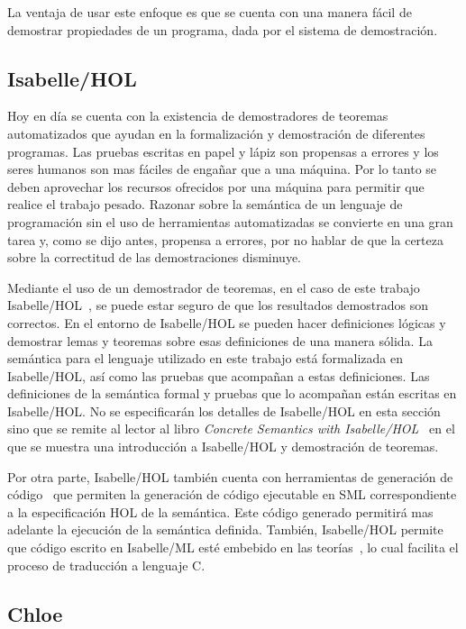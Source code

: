 La ventaja de usar este enfoque es que se cuenta con una manera fácil de demostrar propiedades de un programa, dada por el sistema de demostración.


\subsection{Isabelle/HOL}\label{section:isabelle/hol}

Hoy en día se cuenta con la existencia de demostradores de teoremas automatizados que ayudan en la formalización y demostración de diferentes programas.
Las pruebas escritas en papel y lápiz son propensas a errores y los seres humanos son mas fáciles de engañar que a una máquina.
Por lo tanto se deben aprovechar los recursos ofrecidos por una máquina para permitir que realice el trabajo pesado.
Razonar sobre la semántica de un lenguaje de programación sin el uso de herramientas automatizadas se convierte en una gran tarea y, como se dijo antes, propensa a errores, por no hablar de que la certeza sobre la correctitud de las demostraciones disminuye.

Mediante el uso de un demostrador de teoremas, en el caso de este trabajo Isabelle/HOL~\citep{isabelle-tutorial}, se puede estar seguro de que los resultados demostrados son correctos.
En el entorno de Isabelle/HOL se pueden hacer definiciones lógicas y demostrar lemas y teoremas sobre esas definiciones de una manera sólida.
La semántica para el lenguaje utilizado en este trabajo está formalizada en Isabelle/HOL, así como las pruebas que acompañan a estas definiciones.
Las definiciones de la semántica formal y pruebas que lo acompañan están escritas en Isabelle/HOL.
No se especificarán los detalles de Isabelle/HOL en esta sección sino que se remite al lector al libro \textit{Concrete Semantics with Isabelle/HOL}~\citep{nipkow} en el que se muestra una introducción a Isabelle/HOL y demostración de teoremas.

Por otra parte, Isabelle/HOL también cuenta con herramientas de generación de código~\citep{isabelle-codegen} que permiten la generación de código ejecutable en SML correspondiente a la especificación HOL de la semántica.
Este código generado permitirá mas adelante la ejecución de la semántica definida.
También, Isabelle/HOL permite que código escrito en Isabelle/ML esté embebido en las teorías~\citep{isabelle-implementation}, lo cual facilita el proceso de traducción a lenguaje C.

\subsection{Chloe}\label{subsection:chloe}

